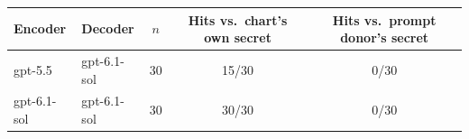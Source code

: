 \begin{tabular}{llccc}
\toprule
Encoder & Decoder & $n$ & Hits vs.\ chart's own secret & Hits vs.\ prompt donor's secret \\
\midrule
gpt-5.5 & gpt-6.1-sol & 30 & 15/30 & 0/30 \\
gpt-6.1-sol & gpt-6.1-sol & 30 & 30/30 & 0/30 \\
\bottomrule
\end{tabular}
